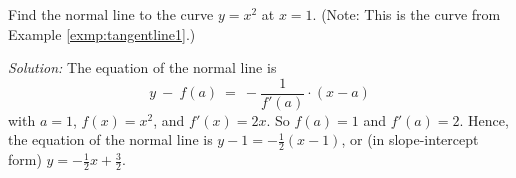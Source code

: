 \begin{exmp}\label{exmp:normalline}
Find the normal line to the curve $y = x^2$ at $x = 1$.
(Note: This is the curve from Example \ref{exmp:tangentline1}.)\vspace{1mm}
\par\noindent\emph{Solution:} The equation of the normal line is
\begin{displaymath}
 y ~-~ f(a) ~=~ -\frac{1}{f'(a)} \cdot (x - a)
\end{displaymath}
with $a = 1$, $f(x) = x^2$, and $f'(x) = 2x$. So $f(a) = 1$ and $f'(a) = 2$.
Hence, the equation of the normal line is
$y - 1 = -\frac{1}{2}(x - 1)$, or (in
slope-intercept form)
$y = -\frac{1}{2}x + \frac{3}{2}$.
\end{exmp}
\divider
\newpage
\vspace{3mm}
\startexercises\label{sec3dot1}
